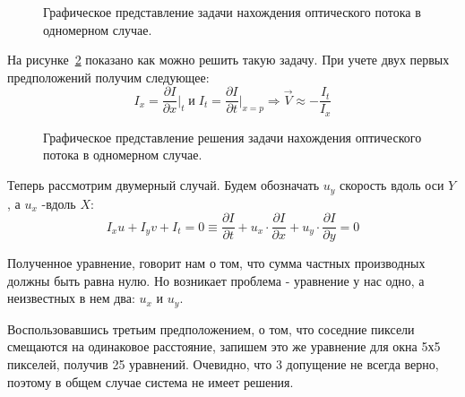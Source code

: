 \begin{figure}[!htb]
\caption{Графическое представление задачи нахождения оптического потока в одномерном случае.}
\label{pic:OptFlow1D}
\end{figure}

На рисунке~\ref{pic:OptFlow1DSolve} показано как можно решить такую задачу. При учете двух первых предположений  получим следующее:
$$
I_x = \frac{\partial I}{\partial x} \Bigr|_t \; и \;
I_t = \frac{\partial I}{\partial t} \Bigr|_{x=p} \Rightarrow 
\vec{V} \approx - \frac{I_t}{I_x}
$$
\begin{figure}[!htb]
\caption{Графическое представление решения задачи нахождения оптического потока в одномерном случае.}
\label{pic:OptFlow1DSolve}
\end{figure}

Теперь рассмотрим двумерный случай. Будем обозначать $u_y$ скорость вдоль оси $Y$, а $u_x$ -вдоль $X$:
$$ I_xu +I_yv+I_t = 0 \equiv 
\frac{\partial I}{\partial t} + 
u_x \cdot \frac{\partial I}{\partial x} + 
u_y \cdot \frac{\partial I}{\partial y} = 0 
$$

Полученное уравнение, говорит нам о том, что сумма частных производных должны быть равна нулю. Но возникает проблема - уравнение у нас одно, а неизвестных в нем два: $u_x$ и $u_y$.

Воспользовавшись третьим предположением, о том, что соседние пиксели смещаются на одинаковое расстояние, запишем это же уравнение для окна 5х5 пикселей, получив 25 уравнений. Очевидно, что 3 допущение не всегда верно, поэтому в общем случае система не имеет решения. 

